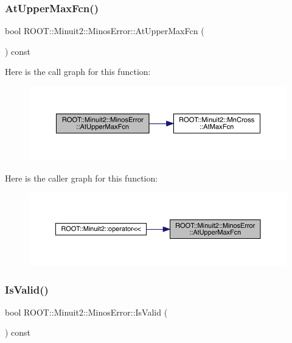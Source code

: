 \subsubsection{\texorpdfstring{AtUpperMaxFcn()}{AtUpperMaxFcn()}\hspace{0.1cm}{\footnotesize\ttfamily [2/2]}}
{\footnotesize\ttfamily bool R\+O\+O\+T\+::\+Minuit2\+::\+Minos\+Error\+::\+At\+Upper\+Max\+Fcn (\begin{DoxyParamCaption}{ }\end{DoxyParamCaption}) const\hspace{0.3cm}{\ttfamily [inline]}}

Here is the call graph for this function\+:
\nopagebreak
\begin{figure}[H]
\begin{center}
\leavevmode
\includegraphics[width=350pt]{d2/dd1/classROOT_1_1Minuit2_1_1MinosError_a940c974f6ac87d22c4d340ef2fc88e8c_cgraph}
\end{center}
\end{figure}
Here is the caller graph for this function\+:\nopagebreak
\begin{figure}[H]
\begin{center}
\leavevmode
\includegraphics[width=350pt]{d2/dd1/classROOT_1_1Minuit2_1_1MinosError_a940c974f6ac87d22c4d340ef2fc88e8c_icgraph}
\end{center}
\end{figure}
\mbox{\label{classROOT_1_1Minuit2_1_1MinosError_af6b7accfe397a06417ecc1f989d82e00}} 
\subsubsection{\texorpdfstring{IsValid()}{IsValid()}\hspace{0.1cm}{\footnotesize\ttfamily [1/2]}}
{\footnotesize\ttfamily bool R\+O\+O\+T\+::\+Minuit2\+::\+Minos\+Error\+::\+Is\+Valid (\begin{DoxyParamCaption}{ }\end{DoxyParamCaption}) const\hspace{0.3cm}{\ttfamily [inline]}}

